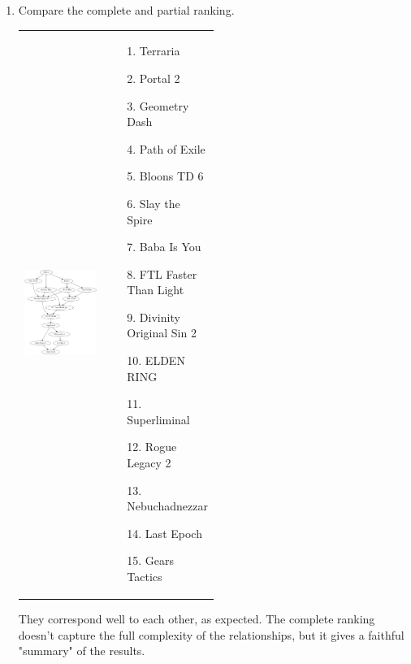 \documentclass{article}
\begin{document}
\begin{enumerate}
    \item Compare the complete and partial ranking.

        \begin{tabular}{cb{0.5\linewidth}}
            \includegraphics[width=0.5\linewidth]{./figures/p1_partial.png} & \begin{enumerate}
             \item [1.] Terraria
             \item [2.] Portal 2
             \item [3.] Geometry Dash
             \item [4.] Path of Exile
             \item [5.] Bloons TD 6
             \item [6.] Slay the Spire
             \item [7.] Baba Is You
             \item [8.] FTL Faster Than Light
             \item [9.] Divinity Original Sin 2
             \item [10.] ELDEN RING
             \item [11.] Superliminal
             \item [12.] Rogue Legacy 2
             \item [13.] Nebuchadnezzar
             \item [14.] Last Epoch
             \item [15.] Gears Tactics
            \end{enumerate}
        \end{tabular}

        They correspond well to each other, as expected. The complete ranking doesn't capture the full complexity of the relationships, but it gives a faithful "summary" of the results.


\end{enumerate}
\end{document}
